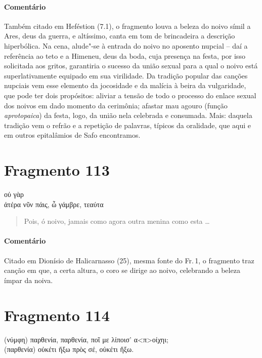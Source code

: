 {\paragraph{Comentário} Também citado em Heféstion (7.1), o fragmento louva a beleza do noivo símil a Ares,
deus da guerra, e altíssimo, canta em tom de brincadeira a descrição
hiperbólica. Na cena, alude"-se à entrada do noivo no aposento nupcial -- daí a
referência ao teto e a Himeneu, deus da boda, cuja presença na festa, por isso
solicitada aos gritos, garantiria o sucesso da união sexual para a qual o noivo está superlativamente equipado em sua virilidade. Da tradição popular das canções nupciais vem esse elemento da jocosidade e da malícia à beira da vulgaridade, que pode ter dois propósitos: aliviar a tensão de todo o processo do enlace sexual dos noivos em dado momento da cerimônia; afastar mau agouro (função \textit{aprotopaica}) da festa, logo, da união nela celebrada e consumada. Mais: daquela tradição vem o refrão e a repetição de palavras, típicos da oralidade, que aqui e em outros epitalâmios de Safo encontramos.}


\section{Fragmento 113}

\begin{gkverse}
  οὐ γὰρ\\
ἀτέρα νῦν πάις, ὦ γάμβρε, τεαύτα
\end{gkverse}

\begin{verse}
Pois, ó noivo, jamais como agora outra menina como esta \ldots{}
\end{verse}

{\paragraph{Comentário} Citado em Dionísio de Halicarnasso (25), mesma fonte do Fr.\,1, o fragmento traz canção em que, a certa altura, o coro se dirige ao noivo, celebrando a beleza ímpar da noiva.}


\pagebreak
\section{Fragmento 114}

\begin{gkverse}
(νύμφη) παρθενία, παρθενία, ποῖ με λίποισ’ α<π>οίχηι;\\
(παρθενία)  \dagger{}οὐκέτι ἤξω πρὸς σέ, οὐκέτι ἤξω\dagger{}.
\end{gkverse}


